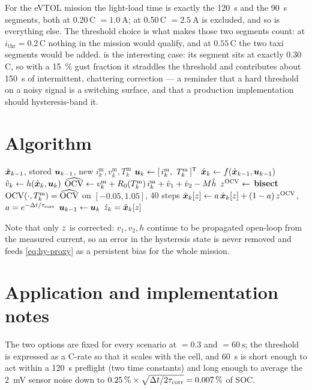 For the eVTOL mission the light-load time is exactly the \SI{120}{\second}  and the
\SI{90}{\second}  segments, both at 0.20\,C $=\SI{1.0}{\ampere}$;  at
0.50\,C $=\SI{2.5}{\ampere}$ is excluded, and so is everything else. The threshold choice is what
makes those two segments count: at $i_{\text{thr}} = 0.2\,$C nothing in the mission would qualify,
and at $0.55\,$C the two taxi segments would be added.  is the interesting case:
its  segment sits at exactly 0.30\,C, so with a \SI{15}{\percent} gust fraction it
straddles the threshold and contributes about \SI{150}{\second} of intermittent, chattering
correction --- a reminder that a hard threshold on a noisy signal is a switching surface, and that a
production implementation should hysteresis-band it.

\section{Algorithm}
\begin{algorithm}[H]
\caption{OCV-corrected Coulomb counting --- one sampling period}
\begin{algorithmic}[1]
\Require $\hat{\bm{x}}_{k-1}$, stored $\bm{u}_{k-1}$, new $i^{\text{m}}_k, v^{\text{m}}_k, T^{\text{m}}_k$
\State $\vu_k \gets [\,i^{\text{m}}_k,\ T^{\text{m}}_k\,]^\T$
 \State $\hat{\bm{x}}_k \gets f(\hat{\bm{x}}_{k-1},\bm{u}_{k-1})$ 
\EndIf
\State $\hat v_k \gets h(\hat{\bm{x}}_k,\bm{u}_k)$ 
 \State $\widehat{\mathrm{OCV}} \gets v^{\text{m}}_k + R_0(T^{\text{m}}_k)\,i^{\text{m}}_k + \hat v_1 + \hat v_2 - M\hat h$
 \State $z^{\mathrm{OCV}} \gets$ \textbf{bisect} $\mathrm{OCV}(\cdot,T^{\text{m}}_k) = \widehat{\mathrm{OCV}}$ on $[-0.05,1.05]$, 40 steps
 \State $\hat{\bm{x}}_k[z] \gets a\,\hat{\bm{x}}_k[z] + (1-a)\,z^{\mathrm{OCV}}$, \quad $a = e^{-\Delta t/\tau_{\text{corr}}}$
\EndIf
\State $\bm{u}_{k-1}\gets\bm{u}_k$
\Ensure $\hat{z}_k = \hat{\bm{x}}_k[z]$
\end{algorithmic}
\end{algorithm}
Note that only $z$ is corrected: $v_1, v_2, h$ continue to be propagated open-loop from the
measured current, so an error in the hysteresis state is never removed and feeds
\eqref{eq:hy-proxy} as a persistent bias for the whole mission.

\section{Application and implementation notes}
The two options are fixed for every scenario at  $=0.3$ and 
$=\SI{60}{\second}$; the threshold is expressed as a C-rate so that it scales with the cell, and
\SI{60}{\second} is short enough to act within a \SI{120}{\second} preflight (two time constants)
and long enough to average the \SI{2}{\milli\volt} sensor noise down to
$\SI{0.25}{\percent}\times\sqrt{\Delta t/2\tau_{\text{corr}}} = \SI{0.007}{\percent}$ of SOC.

